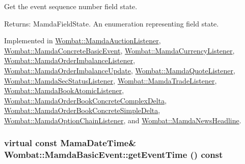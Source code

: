 Get the event sequence number field state. 

\begin{Desc}
\item[Returns:]Mamda\-Field\-State. An enumeration representing field state. \end{Desc}


Implemented in \hyperlink{classWombat_1_1MamdaAuctionListener_2438446343ae500da094c67160f39b66}{Wombat::Mamda\-Auction\-Listener}, \hyperlink{classWombat_1_1MamdaConcreteBasicEvent_295b7ceae0675c43a374d2b38a41ffd2}{Wombat::Mamda\-Concrete\-Basic\-Event}, \hyperlink{classWombat_1_1MamdaCurrencyListener_811aa7d57b26e148bbcbfd66f7f4f963}{Wombat::Mamda\-Currency\-Listener}, \hyperlink{classWombat_1_1MamdaOrderImbalanceListener_1daae80b39ea6a070f2fa736fe90437d}{Wombat::Mamda\-Order\-Imbalance\-Listener}, \hyperlink{classWombat_1_1MamdaOrderImbalanceUpdate_a27a3b4da03381d79a52f6f0d92ff76c}{Wombat::Mamda\-Order\-Imbalance\-Update}, \hyperlink{classWombat_1_1MamdaQuoteListener_14657763833e473324025f3093119656}{Wombat::Mamda\-Quote\-Listener}, \hyperlink{classWombat_1_1MamdaSecStatusListener_6a65bfc69736ed5d4c12e0fe161aff3d}{Wombat::Mamda\-Sec\-Status\-Listener}, \hyperlink{classWombat_1_1MamdaTradeListener_22fb35889eb20ecd6e52d01d5227a74c}{Wombat::Mamda\-Trade\-Listener}, \hyperlink{classWombat_1_1MamdaBookAtomicListener_3ee620bcb87714cb80033e9eeda630dc}{Wombat::Mamda\-Book\-Atomic\-Listener}, \hyperlink{classWombat_1_1MamdaOrderBookConcreteComplexDelta_a9b3bc0a4df49141cda98f802d2372f6}{Wombat::Mamda\-Order\-Book\-Concrete\-Complex\-Delta}, \hyperlink{classWombat_1_1MamdaOrderBookConcreteSimpleDelta_cb5617269c6616eacf33355531a1306d}{Wombat::Mamda\-Order\-Book\-Concrete\-Simple\-Delta}, \hyperlink{classWombat_1_1MamdaOptionChainListener_b268208b087785469f9d86c71e01811b}{Wombat::Mamda\-Option\-Chain\-Listener}, and \hyperlink{classWombat_1_1MamdaNewsHeadline_b1c8d44cfd952aa946279968591b3113}{Wombat::Mamda\-News\-Headline}.\hypertarget{classWombat_1_1MamdaBasicEvent_7285491c2c657207a64b1b0449c0339b}{
\subsubsection[getEventTime]{\setlength{\rightskip}{0pt plus 5cm}virtual const Mama\-Date\-Time\& Wombat::Mamda\-Basic\-Event::get\-Event\-Time () const}}
\label{classWombat_1_1MamdaBasicEvent_7285491c2c657207a64b1b0449c0339b}


